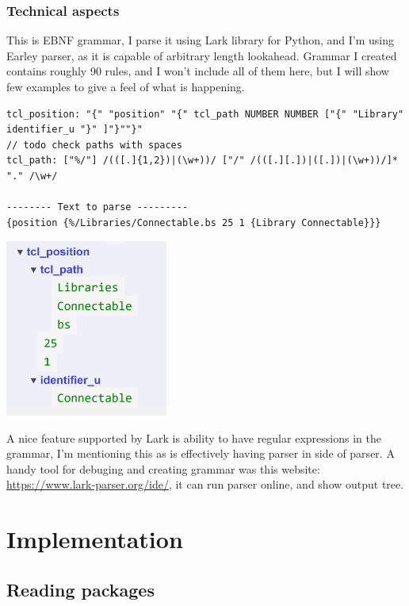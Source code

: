 \documentclass[14pt]{report}
\begin{document}
\subsection{Technical aspects}
This is EBNF grammar, I parse it using Lark library for Python, and I'm using Earley parser, as it is capable of arbitrary length lookahead. Grammar I created contains roughly 90 rules, and I won't include all of them here, but I will show few examples to give a feel of what is happening.
\begin{tcolorbox}[title = Parsing position TODO maybe find a better example with shorter line]
    \begin{verbatim}
tcl_position: "{" "position" "{" tcl_path NUMBER NUMBER ["{" "Library" identifier_u "}" ]"}""}"
// todo check paths with spaces
tcl_path: ["%/"] /(([.]{1,2})|(\w+))/ ["/" /(([.][.])|([.])|(\w+))/]* "." /\w+/

-------- Text to parse ---------
{position {%/Libraries/Connectable.bs 25 1 {Library Connectable}}}
    \end{verbatim}
    \includegraphics[width=0.4\textwidth]{images/TCLPath.png}
\end{tcolorbox}
A nice feature supported by Lark is ability to have regular expressions in the grammar, I'm mentioning this as is effectively having parser in side of parser. A handy tool for debuging and creating grammar was this website: \href{https://www.lark-parser.org/ide/}{https://www.lark-parser.org/ide/}, it can run parser online, and show output tree.

\chapter{Implementation}
\section{Reading packages}
\end{document}
